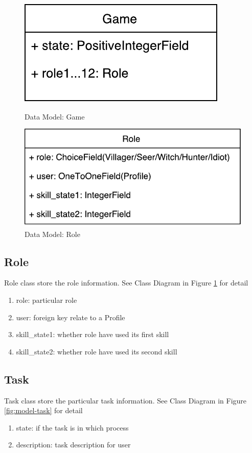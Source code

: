 \documentclass[11pt]{article}
\begin{document}
\begin{figure}
\centering
\begin{minipage}{.5\linewidth}
\centering
\includegraphics[width=0.7\linewidth, keepaspectratio]{model-game.pdf}
\caption{Data Model: Game}
\label{fig:model-game}
\end{minipage}%
\begin{minipage}{.5\linewidth}
\centering
\includegraphics[width=0.9\linewidth, keepaspectratio]{model-role.pdf}
\caption{Data Model: Role}
\label{fig:model-role}
\end{minipage}
\end{figure}

\subsection{Role}
Role class store the role information. See Class Diagram in Figure \ref{fig:model-role} for detail
\begin{enumerate}
\item
role: particular role
\item
user: foreign key relate to a Profile
\item
skill\_state1: whether role have used its first skill
\item
skill\_state2: whether role have used its second skill
\end{enumerate}

\subsection{Task}
Task class store the particular task information. See Class Diagram in Figure \ref{fig:model-task} for detail
\begin{enumerate}
\item
state: if the task is in which process
\item
description: task description for user
\end{enumerate}
\end{document}
